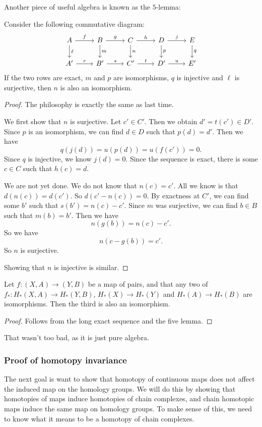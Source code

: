 \documentclass[a4paper]{article}
\begin{document}
Another piece of useful algebra is known as the $5$-lemma:
\begin{lemma}
  Consider the following commutative diagram:
  \[
    \begin{tikzcd}
      A \ar[r, "f"] \ar[d, "\ell"] & B \ar[r, "g"] \ar[d, "m"] & C \ar[r, "h"] \ar[d, "n"] & D \ar[r, "j"] \ar[d, "p"] & E \ar[d, "q"]\\
      A' \ar[r, "r"] & B' \ar[r, "s"] & C' \ar[r, "t"] & D' \ar[r, "u"] & E'
    \end{tikzcd}
  \]
  If the two rows are exact, $m$ and $p$ are isomorphisms, $q$ is injective and $\ell$ is surjective, then $n$ is also an isomorphism.
\end{lemma}

\begin{proof}
  The philosophy is exactly the same as last time.

  We first show that $n$ is surjective. Let $c' \in C'$. Then we obtain $d' = t(c') \in D'$. Since $p$ is an isomorphism, we can find $d \in D$ such that $p(d) = d'$. Then we have
  \[
    q(j(d)) = u(p(d)) = u(f(c')) = 0.
  \]
  Since $q$ is injective, we know $j(d) = 0$. Since the sequence is exact, there is some $c \in C$ such that $h(c) = d$.

  We are not yet done. We do not know that $n(c) = c'$. All we know is that $d(n(c)) = d(c')$. So $d(c' - n(c)) = 0$. By exactness at $C'$, we can find some $b'$ such that $s(b') = n(c) - c'$. Since $m$ was surjective, we can find $b \in B$ such that $m(b) = b'$. Then we have
  \[
    n(g(b)) = n(c) - c'.
  \]
  So we have
  \[
    n(c - g(b)) = c'.
  \]
  So $n$ is surjective.

  Showing that $n$ is injective is similar.
\end{proof}

\begin{cor}
  Let $f: (X, A) \to (Y, B)$ be a map of pairs, and that any two of $f_*: H_*(X, A) \to H_*(Y, B)$, $H_*(X) \to H_*(Y)$ and $H_*(A) \to H_*(B)$ are isomorphisms. Then the third is also an isomorphism.
\end{cor}

\begin{proof}
  Follows from the long exact sequence and the five lemma.
\end{proof}

That wasn't too bad, as it is just pure algebra.

\subsubsection*{Proof of homotopy invariance}
The next goal is want to show that homotopy of continuous maps does not affect the induced map on the homology groups. We will do this by showing that homotopies of maps induce homotopies of chain complexes, and chain homotopic maps induce the same map on homology groups. To make sense of this, we need to know what it means to be a homotopy of chain complexes.
\end{document}
